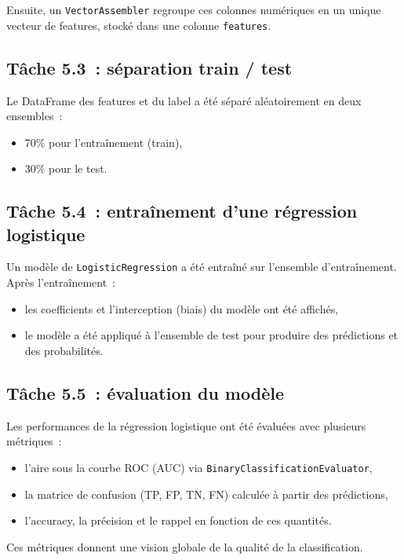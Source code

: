 \documentclass[a4paper,11pt]{article}
\begin{document}
Ensuite, un \texttt{VectorAssembler} regroupe ces colonnes
numériques en un unique vecteur de features, stocké dans une
colonne \texttt{features}.

\subsection{Tâche 5.3~: séparation train / test}

Le DataFrame des features et du label a été séparé aléatoirement
en deux ensembles~:
\begin{itemize}
  \item 70\% pour l'entraînement (train),
  \item 30\% pour le test.
\end{itemize}

\subsection{Tâche 5.4~: entraînement d'une régression logistique}

Un modèle de \texttt{LogisticRegression} a été entraîné sur
l'ensemble d'entraînement. Après l'entraînement~:
\begin{itemize}
  \item les coefficients et l'interception (biais) du modèle
        ont été affichés,
  \item le modèle a été appliqué à l'ensemble de test pour
        produire des prédictions et des probabilités.
\end{itemize}

\subsection{Tâche 5.5~: évaluation du modèle}

Les performances de la régression logistique ont été évaluées
avec plusieurs métriques~:
\begin{itemize}
  \item l'aire sous la courbe ROC (AUC) via
        \texttt{BinaryClassificationEvaluator},
  \item la matrice de confusion (TP, FP, TN, FN) calculée à partir
        des prédictions,
  \item l'accuracy, la précision et le rappel en fonction de ces
        quantités.
\end{itemize}

Ces métriques donnent une vision globale de la qualité de la
classification.
\end{document}
